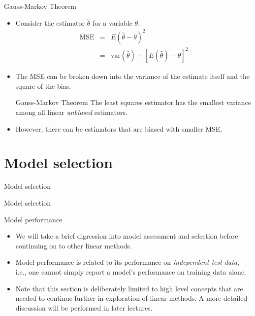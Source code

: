 \documentclass[aspectratio=169]{beamer}
\begin{document}
\begin{frame}{Gauss-Markov Theorem}
    \begin{itemize}
        \item Consider the estimator $\hat{\theta}$ for a variable $\theta$.
        \begin{eqnarray*}
            \mathrm{MSE} & = & E(\hat{\theta} - \theta)^2 \\
            & = & \mathrm{var}(\hat{\theta}) + [E(\hat{\theta}) - \theta]^2
        \end{eqnarray*}
        \item The MSE can be broken down into the variance of the estimate itself and the square of the bias.
        \begin{block}{Gauss-Markov Theorem}
        The least squares estimator has the smallest variance among all linear \textit{unbiased} estimators.
        \end{block}
        \item However, there can be estimators that are biased with smaller MSE.
    \end{itemize}
\end{frame}



\section{Model selection}

\begin{frame}{Model selection}
    \Huge{\centerline{Model selection}}
\end{frame} 


\begin{frame}{Model performance}
    \begin{itemize}
        \item We will take a brief digression into model assessment and selection before continuing on to other linear methods.
        \item Model performance is related to its performance on \textit{independent test data}, i.e., one cannot simply report a model's performance on training data alone.
        \item Note that this section is deliberately limited to high level concepts that are needed to continue further in exploration of linear methods. A more detailed discussion will be performed in later lectures.
    \end{itemize}
\end{frame} 
\end{document}
